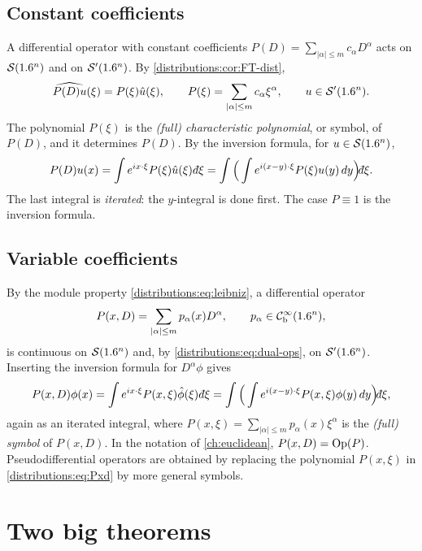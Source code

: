 \subsection{Constant coefficients}
A differential operator with constant coefficients $P(D)=\sum_{|\alpha|\le m}c_\alpha D^\alpha$
acts on $\mathcal{S}(1.6^n)$ and on $\mathcal{S}'(1.6^n)$. By \cref{distributions:cor:FT-dist},
\begin{equation}\label{distributions:eq:PD}
  \widehat{P(D)u}(\xi)=P(\xi)\hat u(\xi),\qquad P(\xi)=\sum_{|\alpha|\le m}c_\alpha\xi^\alpha,
  \qquad u\in\mathcal{S}'(1.6^n).
\end{equation}
The polynomial $P(\xi)$ is the \emph{(full) characteristic polynomial}, or symbol, of
$P(D)$, and it determines $P(D)$. By the inversion formula, for $u\in\mathcal{S}(1.6^n)$,
\begin{equation}\label{distributions:eq:PD-int}
  P(D)u(x)=\int e^{ix\cdot\xi}P(\xi)\hat u(\xi)\,\dbar\xi
  =\int\Big(\int e^{i(x-y)\cdot\xi}P(\xi)u(y)\,dy\Big)\dbar\xi.
\end{equation}
The last integral is \emph{iterated}: the $y$-integral is done first. The case
$P\equiv1$ is the inversion formula.

\subsection{Variable coefficients}
By the module property \eqref{distributions:eq:leibniz}, a differential operator
\[
  P(x,D)=\sum_{|\alpha|\le m}p_\alpha(x)D^\alpha,\qquad p_\alpha\in\mathcal{C}^\infty_{\mathrm{b}}(1.6^n),
\]
is continuous on $\mathcal{S}(1.6^n)$ and, by \eqref{distributions:eq:dual-ops}, on
$\mathcal{S}'(1.6^n)$. Inserting the inversion formula for $D^\alpha\phi$ gives
\begin{equation}\label{distributions:eq:Pxd}
  P(x,D)\phi(x)=\int e^{ix\cdot\xi}P(x,\xi)\hat\phi(\xi)\,\dbar\xi
  =\int\Big(\int e^{i(x-y)\cdot\xi}P(x,\xi)\phi(y)\,dy\Big)\dbar\xi,
\end{equation}
again as an iterated integral, where $P(x,\xi)=\sum_{|\alpha|\le m}p_\alpha(x)\xi^\alpha$ is
the \emph{(full) symbol} of $P(x,D)$. In the notation of \cref{ch:euclidean},
$P(x,D)=\operatorname{Op}(P)$. Pseudodifferential operators are obtained by replacing the polynomial
$P(x,\xi)$ in \eqref{distributions:eq:Pxd} by more general symbols.

\section{Two big theorems}\label{distributions:sec:big}


